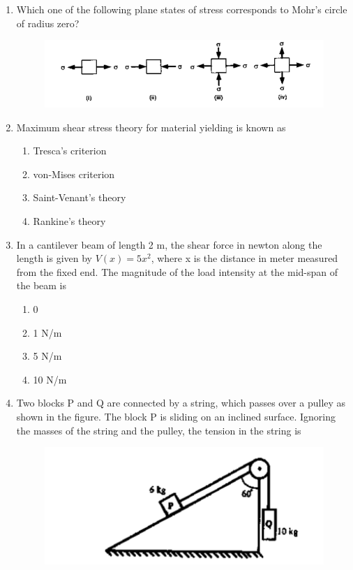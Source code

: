 \documentclass[a4paper,10pt]{article}
\begin{document}
\begin{enumerate}
\item Which one of the following plane states of stress corresponds to Mohr's circle of radius zero?
\hfill{}

\begin{figure}[H]
    \centering
    \includegraphics[width=0.8\columnwidth]{Dq7.png}
    \caption*{}
    \label{fig:q7_solid}
\end{figure}

\item Maximum shear stress theory for material yielding is known as
\hfill{}

\begin{multicols}{2}
\begin{enumerate}
\item Tresca's criterion
\item von-Mises criterion
\item Saint-Venant's theory
\item Rankine's theory
\end{enumerate}
\end{multicols}

\item In a cantilever beam of length 2 m, the shear force in newton  along the length is given by $V(x) = 5x^2$, where x is the distance in meter measured from the fixed end. The magnitude of the load intensity at the mid-span of the beam is
\hfill{}

\begin{multicols}{4}
\begin{enumerate}
\item 0
\item 1 N/m
\item 5 N/m
\item 10 N/m
\end{enumerate}
\end{multicols}

\item Two blocks P and Q are connected by a string, which passes over a pulley as shown in the figure. The block P is sliding on an inclined surface. Ignoring the masses of the string and the pulley, the tension in the string is 
\begin{figure}[H]
    \centering
    \includegraphics[width=0.4\columnwidth]{Dq10.png}
    \caption*{}
    \label{fig:q10_solid}
\end{figure}
\hfill{}


\end{enumerate}
\end{document}
